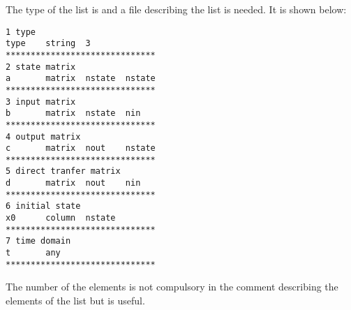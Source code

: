 The type of the list is  and a file describing the list  is
needed. It is shown below:

\begin{verbatim}
1 type
type    string  3
******************************
2 state matrix
a       matrix  nstate  nstate
******************************
3 input matrix
b       matrix  nstate  nin
******************************
4 output matrix
c       matrix  nout    nstate
******************************
5 direct tranfer matrix
d       matrix  nout    nin
******************************
6 initial state
x0      column  nstate
******************************
7 time domain
t       any
******************************
\end{verbatim}

The number of the elements is not compulsory in the comment describing the
elements of the list but is useful.

